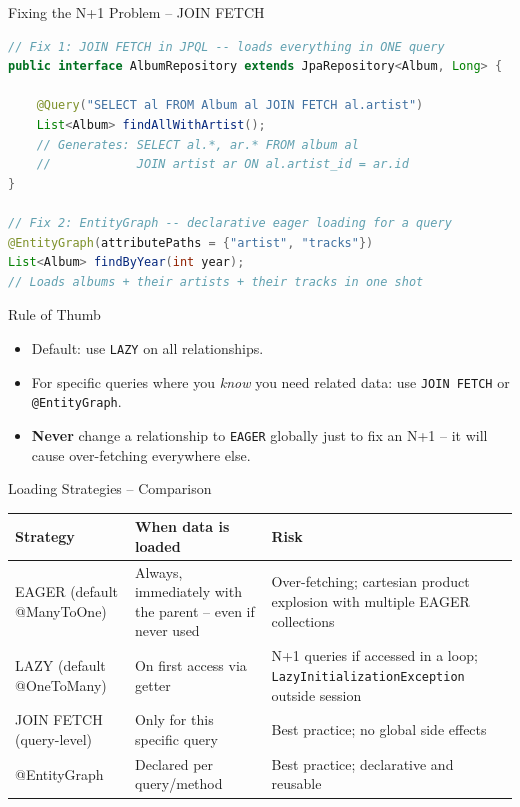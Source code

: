 \begin{frame}[fragile]{Fixing the N+1 Problem -- JOIN FETCH}
  \begin{lstlisting}[style=sqlstyle, language=Java]
// Fix 1: JOIN FETCH in JPQL -- loads everything in ONE query
public interface AlbumRepository extends JpaRepository<Album, Long> {

    @Query("SELECT al FROM Album al JOIN FETCH al.artist")
    List<Album> findAllWithArtist();
    // Generates: SELECT al.*, ar.* FROM album al
    //            JOIN artist ar ON al.artist_id = ar.id
}

// Fix 2: EntityGraph -- declarative eager loading for a query
@EntityGraph(attributePaths = {"artist", "tracks"})
List<Album> findByYear(int year);
// Loads albums + their artists + their tracks in one shot
  \end{lstlisting}

  \begin{block}{Rule of Thumb}
    \begin{itemize}
      \item Default: use \texttt{LAZY} on all relationships.
      \item For specific queries where you \emph{know} you need related data: use
            \texttt{JOIN FETCH} or \texttt{@EntityGraph}.
      \item \textbf{Never} change a relationship to \texttt{EAGER} globally just to fix an N+1
            -- it will cause over-fetching everywhere else.
    \end{itemize}
  \end{block}
\end{frame}

\begin{frame}{Loading Strategies -- Comparison}
  \begin{center}
  \renewcommand{\arraystretch}{1.35}
  \begin{tabularx}{\linewidth}{@{}lXX@{}}
    \toprule
    \textbf{Strategy}  & \textbf{When data is loaded} & \textbf{Risk} \\
    \midrule
    EAGER (default @ManyToOne)
      & Always, immediately with the parent -- even if never used
      & Over-fetching; cartesian product explosion with multiple EAGER collections \\[4pt]
    LAZY (default @OneToMany)
      & On first access via getter
      & N+1 queries if accessed in a loop; \texttt{LazyInitializationException} outside session \\[4pt]
    JOIN FETCH (query-level)
      & Only for this specific query
      & Best practice; no global side effects \\[4pt]
    @EntityGraph
      & Declared per query/method
      & Best practice; declarative and reusable \\
    \bottomrule
  \end{tabularx}
  \end{center}
\end{frame}

